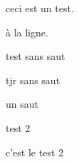 \documentclass{article}
\begin{document}
ceci est un test.

à la ligne.

test sans saut

tjr sans saut

un saut

test 2


c'est le test 2
\end{document}
